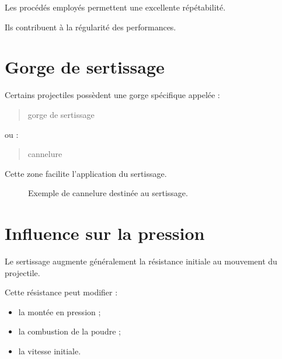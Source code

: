 Les procédés employés permettent une excellente répétabilité.

Ils contribuent à la régularité des performances.

\section{Gorge de sertissage}

Certains projectiles possèdent une gorge spécifique appelée :

\begin{quote}
gorge de sertissage
\end{quote}

ou :

\begin{quote}
cannelure
\end{quote}

Cette zone facilite l'application du sertissage.

\begin{figure}[htbp]
\centering


\caption{Exemple de cannelure destinée au sertissage.}
\label{fig:cannelure}

\end{figure}

\section{Influence sur la pression}

Le sertissage augmente généralement la résistance initiale au mouvement du
projectile.

Cette résistance peut modifier :

\begin{itemize}
    \item la montée en pression ;
    \item la combustion de la poudre ;
    \item la vitesse initiale.
\end{itemize}

